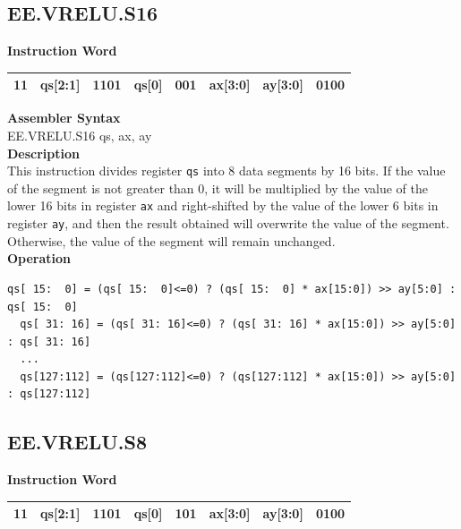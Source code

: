 \clearpage
\subsection{EE.VRELU.S16}\label{instruction:EEVRELUS16}
\setlength\tabcolsep{6pt}
\textbf{Instruction Word} \\
\begin{tabular}{|c|c|c|c|c|c|c|c|}
	\hline
	11 & qs[2:1] & 1101 & qs[0] & 001 & ax[3:0] & ay[3:0] & 0100 \\
	\hline
\end{tabular}

\textbf{Assembler Syntax} \\
EE.VRELU.S16 qs, ax, ay \\
\textbf{Description} \\
This instruction divides register \lstinline{qs} into 8 data segments by 16 bits. If the value of the segment is not greater than 0, it will be multiplied by the value of the lower 16 bits in register \lstinline{ax} and right-shifted by the value of the lower 6 bits in register \lstinline{ay}, and then the result obtained will overwrite the value of the segment. Otherwise, the value of the segment will remain unchanged.\\
\textbf{Operation}
\begin{lstlisting}[escapeinside=`?]
  qs[ 15:  0] = (qs[ 15:  0]<=0) ? (qs[ 15:  0] * ax[15:0]) >> ay[5:0] : qs[ 15:  0]
  qs[ 31: 16] = (qs[ 31: 16]<=0) ? (qs[ 31: 16] * ax[15:0]) >> ay[5:0] : qs[ 31: 16]
  ...
  qs[127:112] = (qs[127:112]<=0) ? (qs[127:112] * ax[15:0]) >> ay[5:0] : qs[127:112]
\end{lstlisting}

\clearpage
\subsection{EE.VRELU.S8}\label{instruction:EEVRELUS8}
\setlength\tabcolsep{6pt}
\textbf{Instruction Word} \\
\begin{tabular}{|c|c|c|c|c|c|c|c|}
	\hline
	11 & qs[2:1] & 1101 & qs[0] & 101 & ax[3:0] & ay[3:0] & 0100 \\
	\hline
\end{tabular}

